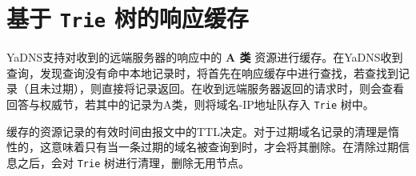 \section{基于 \lstinline{Trie} 树的响应缓存}

YaDNS支持对收到的远端服务器的响应中的 \textbf{A 类} 资源进行缓存。在YaDNS收到查询，发现查询没有命中本地记录时，将首先在响应缓存中进行查找，若查找到记录（且未过期），则直接将记录返回。在收到远端服务器返回的请求时，则会查看回答与权威节，若其中的记录为A类，则将域名-IP地址队存入 \lstinline{Trie} 树中。

缓存的资源记录的有效时间由报文中的TTL决定。对于过期域名记录的清理是惰性的，这意味着只有当一条过期的域名被查询到时，才会将其删除。在清除过期信息之后，会对 \lstinline{Trie} 树进行清理，删除无用节点。

